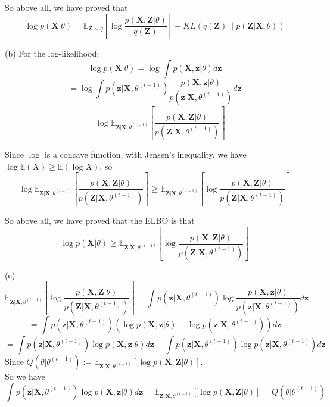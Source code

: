 \documentclass[10pt]{article}
\begin{document}
\begin{enumerate}[1.]
So above all, we have proved that
$$\log p(\boldsymbol{X}|\theta)=\mathbb{E}_{\boldsymbol{Z}\sim q}\left [\log\dfrac{p(\boldsymbol{X},\boldsymbol{Z}|\theta)}{q(\boldsymbol{Z})}\right ]+KL(q(\boldsymbol{Z})\|p(\boldsymbol{Z}|\boldsymbol{X},\theta))$$

(b) For the log-likelihood:
$$\log p(\boldsymbol{X}|\theta)=\log\int p(\boldsymbol{X},\boldsymbol{z}|\theta)d\boldsymbol{z}$$
$$=\log\int p(\boldsymbol{z}|\boldsymbol{X},\theta^{(t-1)})\dfrac{p(\boldsymbol{X},\boldsymbol{z}|\theta)}{p(\boldsymbol{z}|\boldsymbol{X},\theta^{(t-1)})}d\boldsymbol{z}$$
$$=\log \mathbb{E}_{\boldsymbol{Z}|\boldsymbol{X},\theta^{(t-1)}}\left[\dfrac{p(\boldsymbol{X},\boldsymbol{Z}|\theta)}{p(\boldsymbol{Z}|\boldsymbol{X},\theta^{(t-1)})}\right]$$

Since $\log$ is a concave function, with Jensen's inequality, we have $\log \mathbb{E}(X)\geq \mathbb{E}(\log X)$, so
$$\log \mathbb{E}_{\boldsymbol{Z}|\boldsymbol{X},\theta^{(t-1)}}\left[\dfrac{p(\boldsymbol{X},\boldsymbol{Z}|\theta)}{p(\boldsymbol{Z}|\boldsymbol{X},\theta^{(t-1)})}\right]
\geq \mathbb{E}_{\boldsymbol{Z}|\boldsymbol{X},\theta^{(t-1)}}\left[\log \dfrac{p(\boldsymbol{X},\boldsymbol{Z}|\theta)}{p(\boldsymbol{Z}|\boldsymbol{X},\theta^{(t-1)})}\right]$$

So above all, we have proved that the ELBO is that
$$\log p(\boldsymbol{X}|\theta)\geq\mathbb{E}_{\boldsymbol{Z}|\boldsymbol{X},\theta^{(t-1)}}\left[\log \dfrac{p(\boldsymbol{X},\boldsymbol{Z}|\theta)}{p(\boldsymbol{Z}|\boldsymbol{X},\theta^{(t-1)})}\right]$$

(c)
$$\mathbb{E}_{\boldsymbol{Z}|\boldsymbol{X},\theta^{(t-1)}}\left[\log \dfrac{p(\boldsymbol{X},\boldsymbol{Z}|\theta)}{p(\boldsymbol{Z}|\boldsymbol{X},\theta^{(t-1)})}\right]
=\int p(\boldsymbol{z}|\boldsymbol{X},\theta^{(t-1)})\log \dfrac{p(\boldsymbol{X},\boldsymbol{z}|\theta)}{p(\boldsymbol{z}|\boldsymbol{X},\theta^{(t-1)})}d\boldsymbol{z}$$
$$=\int p(\boldsymbol{z}|\boldsymbol{X},\theta^{(t-1)})(\log p(\boldsymbol{X},\boldsymbol{z}|\theta) - \log  p(\boldsymbol{z}|\boldsymbol{X},\theta^{(t-1)}))d\boldsymbol{z}$$
$$=\int p(\boldsymbol{z}|\boldsymbol{X},\theta^{(t-1)})\log p(\boldsymbol{X},\boldsymbol{z}|\theta)d\boldsymbol{z}-\int p(\boldsymbol{z}|\boldsymbol{X},\theta^{(t-1)})\log p(\boldsymbol{z}|\boldsymbol{X},\theta^{(t-1)})d\boldsymbol{z}$$
Since $Q(\theta|\theta^{(t-1)}):=\mathbb{E}_{\boldsymbol{Z}|\boldsymbol{X},\theta^{(t-1)}}\left[\log p(\boldsymbol{X},\boldsymbol{Z}|\theta)\right]$.\\
So we have
$$\int p(\boldsymbol{z}|\boldsymbol{X},\theta^{(t-1)})\log p(\boldsymbol{X},\boldsymbol{z}|\theta)d\boldsymbol{z}=\mathbb{E}_{\boldsymbol{Z}|\boldsymbol{X},\theta^{(t-1)}}\left[\log p(\boldsymbol{X},\boldsymbol{Z}|\theta)\right]=Q(\theta|\theta^{(t-1)})$$


\end{enumerate}
\end{document}

